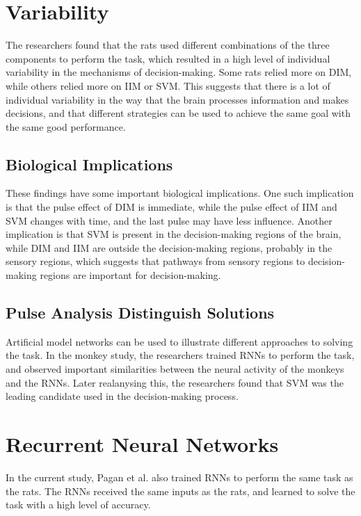 \documentclass{article}
\begin{document}
\section{Variability}
The researchers found that the rats used different combinations of the three components to perform the task, which resulted in a high level of individual variability in the mechanisms of decision-making. Some rats relied more on DIM, while others relied more on IIM or SVM. This suggests that there is a lot of individual variability in the way that the brain processes information and makes decisions, and that different strategies can be used to achieve the same goal with the same good performance.

\subsection{Biological Implications}
These findings have some important biological implications. One such implication is that the pulse effect of DIM is immediate, while the pulse effect of IIM and SVM changes with time, and the last pulse may have less influence. Another implication is that SVM is present in the decision-making regions of the brain, while DIM and IIM are outside the decision-making regions, probably in the sensory regions, which suggests that pathways from sensory regions to decision-making regions are important for decision-making.

\subsection{Pulse Analysis Distinguish Solutions}
Artificial model networks can be used to illustrate different approaches to solving the task. In the monkey study, the researchers trained RNNs to perform the task, and observed important similarities between the neural activity of the monkeys and the RNNs. Later realanysing this, the researchers found that SVM was the leading candidate used in the decision-making process.


\section{Recurrent Neural Networks}
In the current study, Pagan et al. also trained RNNs to perform the same task as the rats. The RNNs received the same inputs as the rats, and learned to solve the task with a high level of accuracy. 
\end{document}
